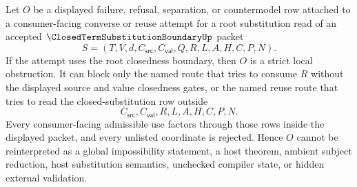 \begin{corollary}
\label{cor:closed-term-substitution-boundary-root-closedness-strict-local-obstruction}
Let $O$ be a displayed failure, refusal, separation, or countermodel row attached to a consumer-facing converse or reuse attempt for a root substitution read of an accepted $\ClosedTermSubstitutionBoundaryUp$ packet
$$
S=(T,V,d,C_{\mathsf{src}},C_{\mathsf{val}},Q,R,L,A,H,C,P,N).
$$
If the attempt uses the root closedness boundary, then $O$ is a strict local obstruction. It can block only the named route that tries to consume $R$ without the displayed source and value closedness gates, or the named reuse route that tries to read the closed-substitution row outside
$$
C_{\mathsf{src}},C_{\mathsf{val}},R,L,A,H,C,P,N.
$$
Every consumer-facing admissible use factors through those rows inside the displayed packet, and every unlisted coordinate is rejected. Hence $O$ cannot be reinterpreted as a global impossibility statement, a host theorem, ambient subject reduction, host substitution semantics, unchecked compiler state, or hidden external validation.
\end{corollary}
